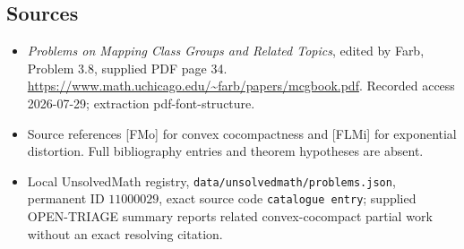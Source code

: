 \documentclass[11pt]{article}
\begin{document}
\subsection{Sources}
\begin{itemize}
\item \emph{Problems on Mapping Class Groups and Related Topics}, edited by Farb, Problem 3.8, supplied PDF page 34. \url{https://www.math.uchicago.edu/~farb/papers/mcgbook.pdf}. Recorded access 2026-07-29; extraction pdf-font-structure.
\item Source references [FMo] for convex cocompactness and [FLMi] for exponential distortion. Full bibliography entries and theorem hypotheses are absent.
\item Local UnsolvedMath registry, \texttt{data/unsolvedmath/problems.json}, permanent ID \(11000029\), exact source code \texttt{catalogue entry}; supplied OPEN-TRIAGE summary reports related convex-cocompact partial work without an exact resolving citation.
\end{itemize}
\end{document}
